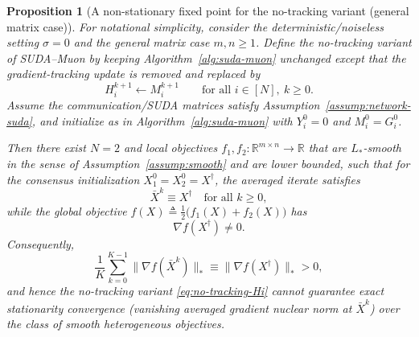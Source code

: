 \documentclass{article}
\newtheorem{proposition}{Proposition}
\newcommand{\sudamuon}{SUDA--Muon}
\begin{document}
\begin{proposition}[A non-stationary fixed point for the no-tracking variant (general matrix case)]
\label{prop:no-tracking-nonstationary-fixed-point}
For notational simplicity, consider the deterministic/noiseless setting $\sigma=0$ and
the general matrix case $m,n\ge 1$.
Define the \emph{no-tracking variant} of \sudamuon{} by keeping
Algorithm~\ref{alg:suda-muon} unchanged except that the gradient-tracking update is
removed and replaced by
\begin{equation}
\label{eq:no-tracking-Hi}
H_i^{k+1} \gets M_i^{k+1}\qquad \text{for all }i\in[N],\ k\ge 0.
\end{equation}
Assume the communication/SUDA matrices satisfy Assumption~\ref{assump:network-suda},
and initialize as in Algorithm~\ref{alg:suda-muon} with $Y_i^0=0$ and $M_i^0=G_i^0$.

Then there exist $N=2$ and local objectives $f_1,f_2:\mathbb{R}^{m\times n}\to\mathbb{R}$
that are $L_*$-smooth in the sense of Assumption~\ref{assump:smooth} and are lower
bounded, such that for the consensus initialization $X_1^0=X_2^0=X^\dagger$, the
averaged iterate satisfies
\[\bar X^k \equiv X^\dagger\quad \text{for all }k\ge 0,\]
while the global objective $f(X)\triangleq\tfrac12\bigl(f_1(X)+f_2(X)\bigr)$ has
\[\nabla f(X^\dagger)\neq 0.
\]
Consequently,
\[
\frac{1}{K}\sum_{k=0}^{K-1}\bigl\|\nabla f(\bar X^k)\bigr\|_* \equiv \bigl\|\nabla f(X^\dagger)\bigr\|_*>0,
\]
and hence the no-tracking variant \eqref{eq:no-tracking-Hi} cannot guarantee exact
stationarity convergence (vanishing averaged gradient nuclear norm at $\bar X^k$)
over the class of smooth heterogeneous objectives.
\end{proposition}
\end{document}

